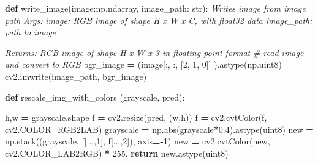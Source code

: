 \documentclass[
]{article}
\newenvironment{Shaded}{\begin{snugshade}}{\end{snugshade}}
\newcommand{\BuiltInTok}[1]{#1}
\newcommand{\CommentTok}[1]{\textcolor[rgb]{0.56,0.35,0.01}{\textit{#1}}}
\newcommand{\ControlFlowTok}[1]{\textcolor[rgb]{0.13,0.29,0.53}{\textbf{#1}}}
\newcommand{\DecValTok}[1]{\textcolor[rgb]{0.00,0.00,0.81}{#1}}
\newcommand{\FloatTok}[1]{\textcolor[rgb]{0.00,0.00,0.81}{#1}}
\newcommand{\KeywordTok}[1]{\textcolor[rgb]{0.13,0.29,0.53}{\textbf{#1}}}
\newcommand{\NormalTok}[1]{#1}
\newcommand{\OperatorTok}[1]{\textcolor[rgb]{0.81,0.36,0.00}{\textbf{#1}}}
\newcommand{\StringTok}[1]{\textcolor[rgb]{0.31,0.60,0.02}{#1}}
\begin{document}
\begin{Shaded}
\begin{Highlighting}[]
\KeywordTok{def}\NormalTok{ write\_image(image:np.ndarray, image\_path: }\BuiltInTok{str}\NormalTok{):}
    \CommentTok{\textquotesingle{}\textquotesingle{}\textquotesingle{}}
\CommentTok{    Writes image from image path}
\CommentTok{    Args:}
\CommentTok{        image: RGB image of shape H x W x C, with float32 data}
\CommentTok{        image\_path: path to image}

\CommentTok{    Returns:}
\CommentTok{        RGB image of shape H x W x 3 in floating point format}
\CommentTok{    \textquotesingle{}\textquotesingle{}\textquotesingle{}}
    \CommentTok{\# read image and convert to RGB}
\NormalTok{    bgr\_image }\OperatorTok{=}\NormalTok{ (image[:, :, [}\DecValTok{2}\NormalTok{, }\DecValTok{1}\NormalTok{, }\DecValTok{0}\NormalTok{]] ).astype(np.uint8)}
\NormalTok{    cv2.imwrite(image\_path, bgr\_image)}
\end{Highlighting}
\end{Shaded}

\begin{Shaded}
\begin{Highlighting}[]
\KeywordTok{def}\NormalTok{ rescale\_img\_with\_colors (grayscale, pred):}
    
\NormalTok{    h,w }\OperatorTok{=}\NormalTok{ grayscale.shape}
\NormalTok{    f }\OperatorTok{=}\NormalTok{ cv2.resize(pred, (w,h))}
\NormalTok{    f }\OperatorTok{=}\NormalTok{ cv2.cvtColor(f, cv2.COLOR\_RGB2LAB)}
\NormalTok{    grayscale }\OperatorTok{=}\NormalTok{ np.}\BuiltInTok{abs}\NormalTok{(grayscale}\OperatorTok{*}\FloatTok{0.4}\NormalTok{).astype(}\StringTok{\textquotesingle{}uint8\textquotesingle{}}\NormalTok{)}
\NormalTok{    new  }\OperatorTok{=}\NormalTok{ np.stack((grayscale, f[...,}\DecValTok{1}\NormalTok{], f[...,}\DecValTok{2}\NormalTok{]), axis}\OperatorTok{={-}}\DecValTok{1}\NormalTok{)}
\NormalTok{    new }\OperatorTok{=}\NormalTok{ cv2.cvtColor(new, cv2.COLOR\_LAB2RGB) }\OperatorTok{*} \FloatTok{255.}
    \ControlFlowTok{return}\NormalTok{ new.astype(}\StringTok{\textquotesingle{}uint8\textquotesingle{}}\NormalTok{)}
    
\end{Highlighting}
\end{Shaded}
\end{document}
